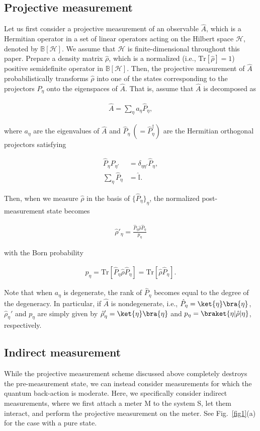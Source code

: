 \documentclass[preprint,pteplogo]{ptephy_v2}%
\numberwithin{equation}{section}
\theoremstyle{definition}
\newcommand{\ml}[1]{\mathcal{#1}}
\newcommand{\mr}[1]{\mathrm{#1}}
\newcommand{\mbb}[1]{\mathbb{#1}}
\newcommand{\aln}[1]{
\begin{align}
#1
\end{align}
}
\newcommand{\Tr}{\mr{Tr}}
\begin{document}
\subsection{Projective measurement}
Let us first consider a projective measurement of an observable $\hat{A}$, which is a Hermitian operator in a set of linear operators acting on the Hilbert space $\ml{H}$, denoted by $\mbb{B}[\ml{H}]$.
We assume that $\ml{H}$ is finite-dimensional throughout this paper.
Prepare a density matrix $\hat{\rho}$, which is a normalized (i.e., $\mr{Tr}[\hat{\rho}]=1$) positive semidefinite operator in $\mbb{B}[\ml{H}]$.
Then, the projective measurement of $\hat{A}$ probabilistically transforms $\hat{\rho}$ into one of the states corresponding to the projectors $\hat{P}_\eta$ onto the eigenspaces of $\hat{A}$.
That is, assume that $\hat{A}$ is decomposed as
\aln{
\hat{A}=\sum_\eta a_\eta\hat{P}_\eta,
}
where $a_\eta$ are the eigenvalues of $\hat{A}$ and $\hat{P}_\eta\:(=\hat{P}_\eta^\dag)$ are the Hermitian orthogonal projectors satisfying 
\aln{
\hat{P}_\eta\hat{P}_{\eta'}&=\delta_{\eta\eta'}\hat{P}_\eta,\\
\sum_\eta\hat{P}_\eta&=\hat{\mbb{I}}.
}
Then, when we measure $\hat{\rho}$ in the basis of $\{\hat{P}_\eta\}_\eta$, the normalized post-measurement state becomes
\aln{
\hat{\rho}'_\eta=\frac{\hat{P}_\eta\hat{\rho}\hat{P}_\eta}{p_\eta}
}
with the Born probability
\aln{
p_\eta=\Tr[\hat{P}_\eta \hat{\rho} \hat{P}_\eta]=\Tr[\hat{\rho}\hat{P}_\eta].
}
Note that when $a_\eta$ is degenerate, the rank of $\hat{P}_\eta$ becomes equal to the degree of the degeneracy. 
In particular, if $\hat{A}$ is nondegenerate, i.e., $\hat{P}_\eta=\ket{\eta}\bra{\eta}$, $\hat{\rho}_\eta'$ and $p_\eta$ are simply given by $\hat{\rho}_\eta'=\ket{\eta}\bra{\eta}$ and $p_\eta=\braket{\eta|\hat{\rho}|\eta}$, respectively.


\subsection{Indirect measurement}\label{sec:indirect}
While the projective measurement scheme discussed above completely destroys the pre-measurement state, we can instead consider measurements for which the quantum back-action is moderate.
Here, we specifically consider indirect measurements, where we first attach a meter M to the system S, let them interact, and perform the projective measurement on the meter. 
See Fig.~\ref{fig1}(a) for the case with a pure state.
\end{document}
